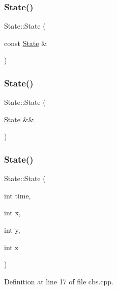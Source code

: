 \subsubsection{\texorpdfstring{State()}{State()}\hspace{0.1cm}{\footnotesize\ttfamily [5/8]}}
{\footnotesize\ttfamily State\+::\+State (\begin{DoxyParamCaption}\item[{const \hyperlink{struct_state}{State} \&}]{ }\end{DoxyParamCaption})\hspace{0.3cm}{\ttfamily [default]}}

\mbox{\label{struct_state_a28668e1b15e6d6cfb63106769db218bc}} 
\subsubsection{\texorpdfstring{State()}{State()}\hspace{0.1cm}{\footnotesize\ttfamily [6/8]}}
{\footnotesize\ttfamily State\+::\+State (\begin{DoxyParamCaption}\item[{\hyperlink{struct_state}{State} \&\&}]{ }\end{DoxyParamCaption})\hspace{0.3cm}{\ttfamily [default]}}

\mbox{\label{struct_state_acd7182e04da1e5c712fdda9a0dd329bd}} 
\subsubsection{\texorpdfstring{State()}{State()}\hspace{0.1cm}{\footnotesize\ttfamily [7/8]}}
{\footnotesize\ttfamily State\+::\+State (\begin{DoxyParamCaption}\item[{int}]{time,  }\item[{int}]{x,  }\item[{int}]{y,  }\item[{int}]{z }\end{DoxyParamCaption})\hspace{0.3cm}{\ttfamily [inline]}}



Definition at line 17 of file cbs.\+cpp.


